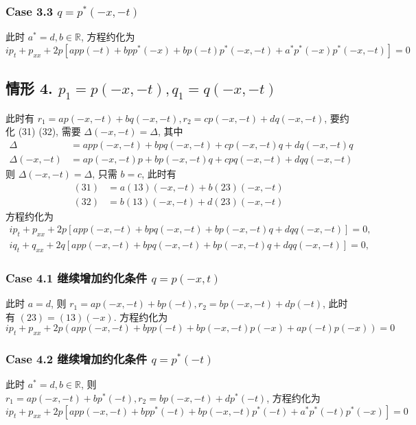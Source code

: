 \subsubsection*{Case 3.3 $ q = p^{*}(-x,-t) $}
此时 $ a^{*} = d , b \in \mathbb{R}$, 方程约化为
\begin{equation}
    ip_t + p_{xx} + 2p \left[ app(-t) + bpp^{*}(-x) + bp(-t)p^{*}(-x,-t) + a^{*}p^{*}(-x)p^{*}(-x,-t) \right] = 0
\end{equation}

\subsection*{情形 4. $ p_{1} = p(-x,-t), q_{1} = q(-x,-t) $}
此时有 $r_1 = ap(-x,-t) + bq(-x,-t), r_2 = cp(-x,-t) + dq(-x,-t) $, 要约化 (31) (32), 需要 $ \Delta(-x,-t) = \Delta $, 其中
\begin{align}
    \Delta        & = app(-x,-t) + bpq(-x,-t) + cp(-x,-t)q + dq(-x,-t)q \\
    \Delta(-x,-t) & = ap(-x,-t)p + bp(-x,-t)q + cpq(-x,-t) + dqq(-x,-t)
\end{align}
则 $ \Delta(-x,-t) = \Delta $, 只需 $ b=c $, 此时有
\begin{align}
    (31) & = a(13)(-x,-t) + b(23)(-x,-t) \\
    (32) & = b(13)(-x,-t) + d(23)(-x,-t)
\end{align}
方程约化为
\begin{align}
    ip_{t} + p_{xx} + 2p \left[ app(-x,-t) + bpq(-x,-t) + bp(-x,-t)q + dqq(-x,-t) \right] = 0, \label{ch4-eq-reduction-inverse-xt-p} \\
    iq_{t} + q_{xx} + 2q \left[ app(-x,-t) + bpq(-x,-t) + bp(-x,-t)q + dqq(-x,-t) \right] = 0, \label{ch4-eq-reduction-inverse-xt-q}
\end{align}

\subsubsection*{Case 4.1 继续增加约化条件 $ q = p(-x,t) $}
此时 $ a = d $, 则 $ r_1 = ap(-x,-t) + bp(-t), r_2 = bp(-x,-t) + dp(-t) $, 此时有 $ (23) = (13)(-x) $. 方程约化为
\begin{equation}
    ip_t + p_{xx} + 2p \left( app(-x,-t) + bpp(-t) + bp(-x,-t)p(-x) + ap(-t)p(-x) \right) = 0
\end{equation}

\subsubsection*{Case 4.2 继续增加约化条件 $ q = p^{*}(-t) $}
此时 $ a^{*} = d , b \in \mathbb{R}$, 则 $ r_1 = ap(-x,-t) + bp^{*}(-t), r_2 = bp(-x,-t) + dp^{*}(-t)$, 方程约化为
\begin{equation}
    ip_t + p_{xx} + 2p \left[ app(-x,-t) + bpp^{*}(-t) + bp(-x,-t)p^{*}(-t) + a^{*}p^{*}(-t)p^{*}(-x) \right] = 0
\end{equation}

